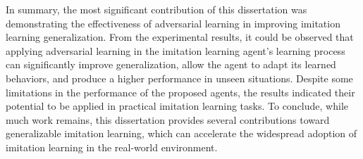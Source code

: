 In summary,
the most significant contribution of this dissertation was demonstrating the effectiveness of adversarial learning in improving imitation learning generalization.
From the experimental results,
it could be observed that applying adversarial learning in the imitation learning agent's learning process can significantly improve generalization,
allow the agent to adapt its learned behaviors,
and produce a higher performance in unseen situations.
Despite some limitations in the performance of the proposed agents,
the results indicated their potential to be applied in practical imitation learning tasks.
To conclude,
while much work remains,
this dissertation provides several contributions toward generalizable imitation learning,
which can accelerate the widespread adoption of imitation learning in the real-world environment.
